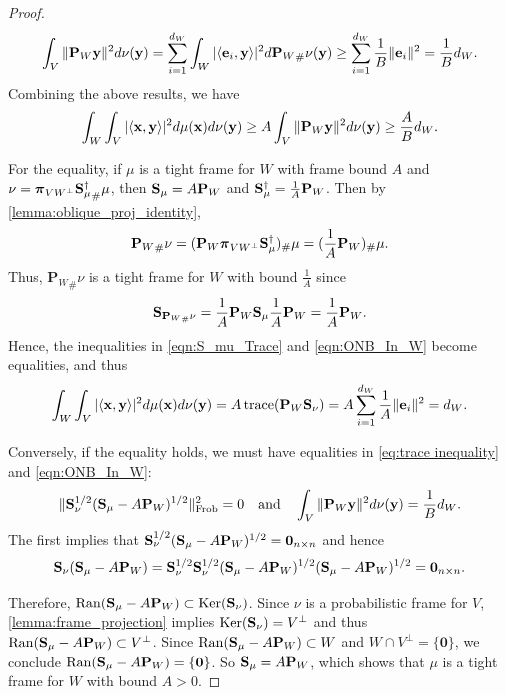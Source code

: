\documentclass{amsart}
\numberwithin{equation}{section}
\DeclareMathOperator{\kernel}{Ker}
\DeclareMathOperator{\range}{Ran}
\DeclareMathOperator{\trace}{trace}
\newcommand{\bP}{{\mathbf P}}
\newcommand{\bpi}{{\boldsymbol{\pi}}}
\theoremstyle{plain}
\theoremstyle{remark}
\theoremstyle{definition}
\begin{document}
\begin{proof}
\begin{equation}\label{eqn:ONB_In_W}
   \int_{V} \|\bP_W {\bf y}\|^2 d\nu({\bf y}) 
   =  \sum_{i=1}^{d_W}\int_{W} |\langle {\bf e}_i, {\bf y} \rangle|^2 d {\bP_W}_\#\nu({\bf y}) \geq \sum_{i=1}^{d_W} \frac{1}{B} \Vert{\bf e}_i \Vert^2 =  \frac{1}{B}d_W.
\end{equation}
Combining the above results, we have 
\begin{equation*}
    \begin{split}
       \int_{W}  \int_{V} |\langle {\bf x}, {\bf y} \rangle |^2 d\mu({\bf x}) d\nu({\bf y}) \geq A \int_{V} \|\bP_W {\bf y}\|^2 d\nu({\bf y})  \geq \frac{A}{B}d_W.
    \end{split}
\end{equation*}

For the equality, if $\mu$ is a tight frame for $W$ with frame bound $A$ and $\nu = {\bpi_{VW^\perp}{\bf S}^{\dagger}_\mu}_\# \mu$, then ${\bf S}_\mu = A \bP_W$ and ${\bf S}^{\dagger}_\mu = \frac{1}{A}\bP_W$. Then by \cref{lemma:oblique_proj_identity}, 
$${\bP_W}_\#\nu = (\bP_W \bpi_{VW^\perp}{\bf S}^{\dagger}_\mu)_\# \mu = (\frac{1}{A}\bP_W)_\#\mu.$$
Thus, ${\bP_W}_\#\nu$ is a tight frame for $W$ with bound $\frac{1}{A}$ since $${\bf S}_{{\bP_W}_\#\nu} = \frac{1}{A}\bP_W {\bf S}_\mu \frac{1}{A}\bP_W  = \frac{1}{A}\bP_W.$$ 
Hence, the inequalities in \eqref{eqn:S_mu_Trace} and \eqref{eqn:ONB_In_W} become equalities, and thus
\begin{equation*}
        \int_{W}  \int_{V} |\langle {\bf x}, {\bf y} \rangle |^2 d\mu({\bf x}) d\nu({\bf y}) = A \trace(\bP_W{\bf S}_\nu) = A  \sum_{i=1}^{d_W} \frac{1}{A} \Vert{\bf e}_i \Vert^2 =  d_W.
\end{equation*}

Conversely, if the equality holds, we must have equalities in  \eqref{eq:trace inequality} and \eqref{eqn:ONB_In_W}:
\begin{equation}\label{eqn:equality_Theorem_5_5}
   \|{\bf S}_\nu^{1/2} ({\bf S}_\mu - A\bP_W)^{1/2}\|^2_{\text{Frob}} = 0 \quad \text{and} \quad \int_{V} \|\bP_W {\bf y}\|^2 d\nu({\bf y}) = \frac{1}{B}d_W.
\end{equation}
The first implies that ${\bf S}_\nu^{1/2}({\bf S}_\mu- A\bP_W)^{1/2} = \mathbf{0}_{n \times n}$ and hence
$${\bf S}_\nu({\bf S}_\mu- A\bP_W) = {\bf S}_\nu^{1/2} {\bf S}_\nu^{1/2} ({\bf S}_\mu- A\bP_W)^{1/2}({\bf S}_\mu- A\bP_W)^{1/2}  = \mathbf{0}_{n \times n}.$$

Therefore, $\range({\bf S}_\mu- A\bP_W) \subset \kernel({\bf S}_\nu)$. Since $\nu$ is a probabilistic frame for $V$, \cref{lemma:frame_projection} implies $\kernel({\bf S}_\nu) = V^\perp$ and thus $\range({\bf S}_\mu- A\bP_W) \subset V^\perp$. Since $\range({\bf S}_\mu- A\bP_W) \subset W$ and $W \cap V^\perp = \{\mathbf{0}\}$, we conclude $\range({\bf S}_\mu- A\bP_W) = \{{\mathbf{0}}\}$. So  ${\bf S}_\mu= A\bP_W $, which shows that $\mu$ is a tight frame for $W$ with bound $A>0$. 


\end{proof}
\end{document}

